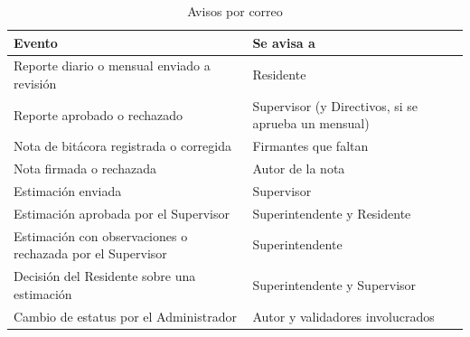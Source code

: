 \begin{table}[h]
\centering\small
\caption{Avisos por correo}\label{tab:avisos}
\begin{tabularx}{\linewidth}{@{}>{\raggedright\arraybackslash}p{6cm}X@{}}
\toprule
\sffamily\bfseries Evento & \sffamily\bfseries Se avisa a\\\midrule
Reporte diario o mensual enviado a revisión & Residente\\
Reporte aprobado o rechazado & Supervisor (y Directivos, si se aprueba un mensual)\\
Nota de bitácora registrada o corregida & Firmantes que faltan\\
Nota firmada o rechazada & Autor de la nota\\
Estimación enviada & Supervisor\\
Estimación aprobada por el Supervisor & Superintendente y Residente\\
Estimación con observaciones o rechazada por el Supervisor & Superintendente\\
Decisión del Residente sobre una estimación & Superintendente y Supervisor\\
Cambio de estatus por el Administrador & Autor y validadores involucrados\\
\bottomrule
\end{tabularx}
\end{table}
